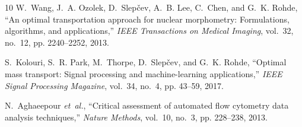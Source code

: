 \documentclass[10pt,journal,compsoc]{IEEEtran}
\begin{document}
\begin{thebibliography}{10}
W.~Wang, J.~A. Ozolek, D.~Slep{\v{c}}ev, A.~B. Lee, C.~Chen, and G.~K. Rohde, ``An optimal transportation approach for nuclear morphometry: Formulations, algorithms, and applications,'' \emph{IEEE Transactions on Medical Imaging}, vol.~32, no.~12, pp. 2240--2252, 2013.

S.~Kolouri, S.~R. Park, M.~Thorpe, D.~Slep{\v{c}}ev, and G.~K. Rohde, ``Optimal mass transport: Signal processing and machine-learning applications,'' \emph{IEEE Signal Processing Magazine}, vol.~34, no.~4, pp. 43--59, 2017.

N.~Aghaeepour \emph{et~al.}, ``Critical assessment of automated flow cytometry data analysis techniques,'' \emph{Nature Methods}, vol.~10, no.~3, pp. 228--238, 2013.

\end{thebibliography}
\end{document}
